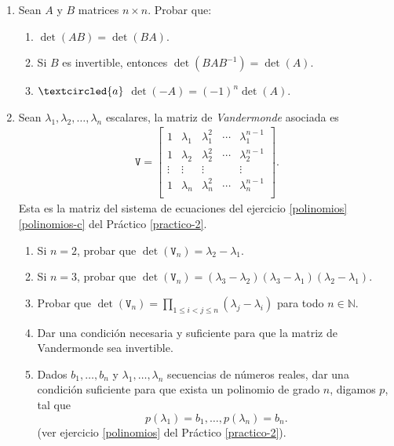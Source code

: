 \begin{enumerate}[topsep=6pt,itemsep=.4cm]
\item Sean $A$ y  $B$ matrices $n \times n$. Probar que:


\begin{enumerate}
    \item $\det(AB) = \det (BA)$.
    \item Si $B$ es invertible, entonces $\det(B A B^{-1}) = \det (A)$.
    \item\label{-A} $\textcircled{a}$ $\det(-A) = (-1)^n\det (A)$.
\end{enumerate}


\item\label{vandermonde} Sean $\lambda_1, \lambda_2, \dots, \lambda_n$ escalares, la matriz de \emph{Vandermonde} asociada es
\begin{align*}
\mathtt V = \begin{bmatrix}
1 & \lambda_1 & \lambda_1^2 & \cdots & \lambda_1^{n-1}\\
1 & \lambda_2 & \lambda_2^2 & \cdots & \lambda_2^{n-1}\\
\vdots &\vdots &\vdots & &\vdots\\
1 & \lambda_n & \lambda_n^2 & \cdots & \lambda_n^{n-1}\\
\end{bmatrix}.
\end{align*}
Esta es la matriz del sistema de ecuaciones del ejercicio \ref{polinomios}\,\ref{polinomios-c} del Práctico \ref{practico-2}.

\begin{enumerate}
    \item\label{vandermonde 2} Si $n=2$, probar que $\det(\mathtt V_n) = \lambda_2-\lambda_1$.
    \item\label{vandermonde 3} Si $n=3$, probar que $\det(\mathtt V_n) = (\lambda_3-\lambda_2) (\lambda_3-\lambda_1) (\lambda_2-\lambda_1)$.
    \item\label{vandermonde gral} Probar que $\det(\mathtt V_n) = \prod_{1\leq i< j \leq n}(\lambda_j-\lambda_i)$ para todo $n\in\mathbb{N}$.
    \item\label{vandermonde inv} Dar una condición necesaria y suficiente para que la matriz de Vandermonde sea invertible.
    \item\label{vandermonde sol} Dados $b_1, \ldots, b_n$  y $\lambda_1, \ldots, \lambda_n$ secuencias de números reales,  dar una condición suficiente para que exista un  polinomio de grado $n$, digamos $p$, tal que 
    $$
    p(\lambda_1)=b_1, \ldots, p(\lambda_n)=b_n.
    $$
    (ver ejercicio \ref{polinomios} del Práctico \ref{practico-2}).
\end{enumerate}



\end{enumerate}
